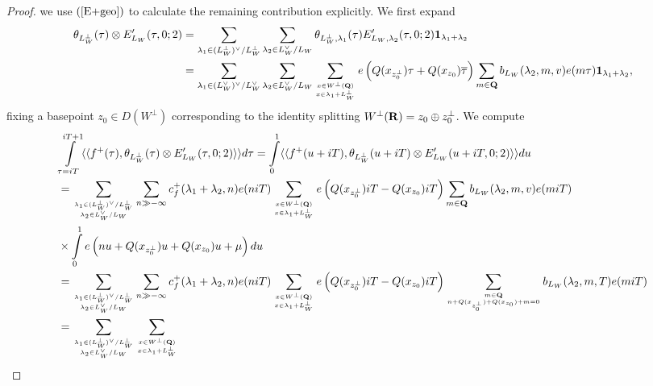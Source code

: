 \documentclass{amsart}
\theoremstyle{definition}
\theoremstyle{definition}
\theoremstyle{definition}
\begin{document}
\begin{proof}
we use $(\ref{E+geo})$ to calculate the remaining contribution explicitly. We first expand 
\begin{align*} \theta_{L_W^{\perp}}(\tau) \otimes E_{L_W}'(\tau, 0; 2) 
&= \sum\limits_{ \lambda_1 \in (L_W^{\perp})^{\vee}/L_W^{\perp} } \sum\limits_{\lambda_2 \in L_W^{\vee}/L_W}
\theta_{L_W^{\perp}, \lambda_1}(\tau) E_{L_W, \lambda_2}'(\tau, 0; 2) {\bf{1}}_{\lambda_1 + \lambda_2} \\
&=  \sum\limits_{ \lambda_1 \in (L_W^{\vee})^{\vee}/L_W^{\vee} } \sum\limits_{\lambda_2 \in L_W^{\vee}/L_W}
\sum\limits_{ x \in W^{\perp}({\bf{Q}}) \atop x \in \lambda_1 + L_W^{\perp} } e \left( Q(x_{z_0^{\perp}}) \tau + Q(x_{z_0}) \overline{\tau} \right) 
\sum\limits_{m \in {\bf{Q}}} b_{L_W}(\lambda_2, m, v) e(m \tau) {\bf{1}}_{\lambda_1 + \lambda_2}, \end{align*}
fixing a basepoint $z_0 \in D(W^{\perp})$ corresponding to the identity splitting $W^{\perp}({\bf{R}}) = z_0 \oplus z_0^{\perp}$. We compute 
\begin{equation*}\begin{aligned} &\int\limits_{\tau = i T}^{iT + 1} \langle \langle f^+(\tau), \theta_{L_W^{\perp}}(\tau) \otimes E_{L_W}'(\tau, 0; 2) \rangle \rangle d \tau
= \int\limits_0^1 \langle \langle f^+(u + iT), \theta_{L_W^{\perp}}(u + iT) \otimes E_{L_W}'(u + iT, 0; 2)  \rangle \rangle du \\
&= \sum\limits_{ \lambda_1 \in (L_W^{\perp})^{\vee} / L_W^{\perp} \atop \lambda_2 \in L_W^{\vee}/L_W  }
\sum\limits_{n \gg - \infty} c_{f}^+(\lambda_1 + \lambda_2, n) e(niT)
\sum\limits_{x \in W^{\perp}({\bf{Q}}) \atop x \in \lambda_1 + L_W^{\perp}} e \left( Q(x_{z_0^{\perp}})iT - Q(x_{z_0})iT \right)
\sum\limits_{m \in {\bf{Q}}} b_{L_W}(\lambda_2, m, v) e(miT) \\
&\times \int\limits_0^1 e\left( nu + Q(x_{z_0^{\perp}})u + Q(x_{z_0})u + \mu \right) du \\ 
&= \sum\limits_{ \lambda_1 \in (L_W^{\perp})^{\vee} / L_W^{\perp} \atop \lambda_2 \in L_W^{\vee}/L_W  }
\sum\limits_{n \gg - \infty} c_{f}^+(\lambda_1 + \lambda_2, n) e(niT)
\sum\limits_{x \in W^{\perp}({\bf{Q}}) \atop x \in \lambda_1 + L_W^{\perp}} e \left( Q(x_{z_0^{\perp}})iT - Q(x_{z_0})iT \right)
\sum\limits_{m \in {\bf{Q}} \atop n + Q(x_{z_0^{\perp}}) + Q(x_{z_0}) + m=0 } b_{L_W}(\lambda_2, m, T) e(miT)\\
&=  \sum\limits_{ \lambda_1 \in (L_W^{\perp})^{\vee} / L_W^{\perp} \atop \lambda_2 \in L_W^{\vee}/L_W  } 
\sum\limits_{x \in W^{\perp} ({\bf{Q}}) \atop x \in \lambda_1 + L_W^{\perp}} 

\end{aligned}
\end{equation*}
\end{proof}
\end{document}
